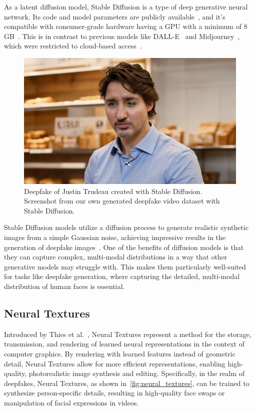 As a latent diffusion model, Stable Diffusion is a type of deep generative neural network.
Its code and model parameters are publicly available~\cite{sd-github}, and it's
compatible with consumer-grade hardware having a GPU with a minimum of
8 GB~\cite{enwiki:1169859793}. This is in contrast to previous models like DALL-E~\cite{dall-e}
and Midjourney~\cite{midjourney}, which were restricted to cloud-based access~\cite{enwiki:1169859793,sd-theverge}.

\begin{figure}[htpb]
	\centering
	\includegraphics[width=0.59\columnwidth]{figures/justion-trudeau-stable-diff}
	\caption{Deepfake of Justin Trudeau created with Stable Diffusion.
		Screenshot from our own generated deepfake video dataset with Stable Diffusion.}
\end{figure}

Stable Diffusion models utilize a diffusion process to generate realistic synthetic
images from a simple Gaussian noise, achieving impressive results in the generation of
deepfake images~\cite{wu2022unifying}. One of the benefits of diffusion models
is that they can capture complex, multi-modal distributions in a way that
other generative models may struggle with. This makes them particularly
well-suited for tasks like deepfake generation, where capturing the
detailed, multi-modal distribution of human faces is essential.

\subsection{Neural Textures}
Introduced by Thies et al.~\cite{thies2019deferred}, Neural Textures represent
a method for the storage, transmission, and rendering of learned
neural representations in the context of computer graphics.
By rendering with learned features instead of geometric detail, Neural
Textures allow for more efficient representations, enabling high-quality,
photorealistic image synthesis and editing. Specifically, in the realm of
deepfakes, Neural Textures, as shown in~\autoref{fig:neural_textures}, can be trained to synthesize person-specific
details, resulting in high-quality face swaps or manipulation of facial
expressions in videos.

